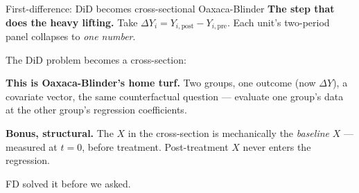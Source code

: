 \documentclass[aspectratio=169,11pt]{beamer}
\begin{document}
\begin{frame}{First-difference: DiD becomes cross-sectional Oaxaca-Blinder}
\footnotesize
\textbf{The step that does the heavy lifting.} \;Take $\Delta Y_i = Y_{i,\text{post}} - Y_{i,\text{pre}}$. \;Each unit's two-period panel collapses to \textit{one number}.

\vspace{0.5em}
The DiD problem becomes a cross-section:
\begin{center}
\end{center}

\vspace{0.5em}
\textbf{This is Oaxaca-Blinder's home turf.} \;Two groups, one outcome (now $\Delta Y$), a covariate vector, the same counterfactual question --- evaluate one group's data at the other group's regression coefficients.

\vspace{0.6em}
\textbf{Bonus, structural.} \;The $X$ in the cross-section is mechanically the \textit{baseline} $X$ --- measured at $t = 0$, before treatment. \;Post-treatment $X$ never enters the regression.

\vspace{0.3em}
\begin{center}
 \;FD solved it before we asked.
\end{center}
\end{frame}
\end{document}
